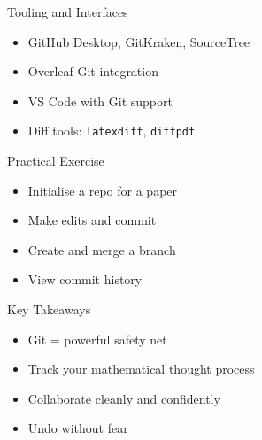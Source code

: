 \documentclass[12pt,t]{beamer}
\begin{document}
\begin{frame}{Tooling and Interfaces}
\begin{itemize}
    \item GitHub Desktop, GitKraken, SourceTree
		\pause
    \item Overleaf Git integration
		\pause
    \item VS Code with Git support
		\pause
    \item Diff tools: \texttt{latexdiff}, \texttt{diffpdf}
\end{itemize}
\end{frame}

\begin{frame}{Practical Exercise}
\begin{itemize}
    \item Initialise a repo for a paper
		\pause
    \item Make edits and commit
		\pause
    \item Create and merge a branch
		\pause
    \item View commit history
\end{itemize}
\end{frame}

\begin{frame}{Key Takeaways}
\begin{itemize}
    \item Git = powerful safety net
		\pause
    \item Track your mathematical thought process
		\pause
    \item Collaborate cleanly and confidently
		\pause
    \item Undo without fear
\end{itemize}
\end{frame}
\end{document}
